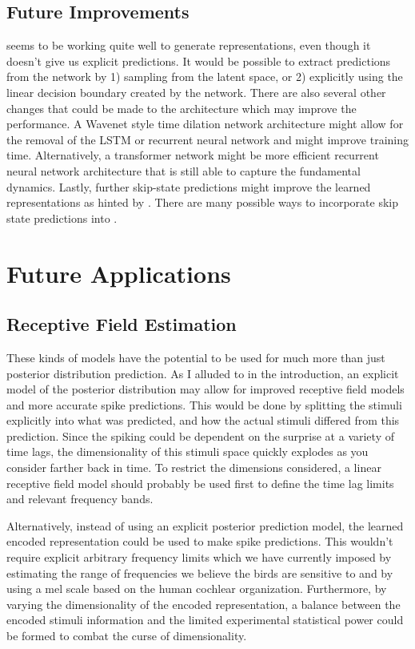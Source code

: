 \subsection{Future Improvements}
\CPC seems to be working quite well to generate representations, even though it doesn't give us explicit predictions. It would be possible to extract predictions from the \CPC network by 1) sampling from the latent space, or 2) explicitly using the linear decision boundary created by the network. There are also several other changes that could be made to the architecture which may improve the performance. A Wavenet \cite{van2016wavenet} style time dilation network architecture might allow for the removal of the LSTM or recurrent neural network and might improve training time. Alternatively, a transformer network \cite{vaswani2017attention} might be more efficient recurrent neural network architecture that is still able to capture the fundamental dynamics. Lastly, further skip-state predictions might improve the learned representations as hinted by \cite{gregor2018temporal}. There are many possible ways to incorporate skip state predictions into \CPC.

\section{Future Applications}

\subsection{Receptive Field Estimation}
These kinds of models have the potential to be used for much more than just posterior distribution prediction. As I alluded to in the introduction, an explicit model of the posterior distribution may allow for improved receptive field models and more accurate spike predictions. This would be done by splitting the stimuli explicitly into what was predicted, and how the actual stimuli differed from this prediction. Since the spiking could be dependent on the surprise at a variety of time lags, the dimensionality of this stimuli space quickly explodes as you consider farther back in time. To restrict the dimensions considered, a linear receptive field model should probably be used first to define the time lag limits and relevant frequency bands.

Alternatively, instead of using an explicit posterior prediction model, the learned \CPC encoded representation could be used to make spike predictions. This wouldn't require explicit arbitrary frequency limits which we have currently imposed by estimating the range of frequencies we believe the birds are sensitive to and by using a mel scale based on the human cochlear organization. Furthermore, by varying the dimensionality of the \CPC encoded representation, a balance between the encoded stimuli information and the limited experimental statistical power could be formed to combat the curse of dimensionality.

